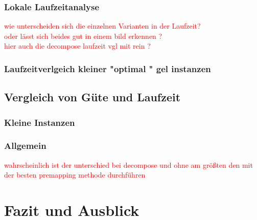 \documentclass[11pt, a4paper, german]{article}
\begin{document}
\subsubsection{Lokale Laufzeitanalyse}
\textcolor{red}{wie unterscheiden sich die einzelnen Varianten in der Laufzeit? \\ oder lässt sich beides gut in einem bild erkennen ?} \\

\textcolor{red}{hier auch die decompose laufzeit vgl mit rein ?}
 
\subsubsection{Laufzeitverlgeich kleiner "optimal " gel instanzen}


\subsection{Vergleich von Güte und  Laufzeit}
\subsubsection{Kleine Instanzen}

\subsubsection{Allgemein}
\textcolor{red}{wahrscheinlich ist der unterschied bei decompose und ohne am größten den mit der besten premapping methode durchführen}

\section{Fazit und Ausblick}
\label{sec:fazit_und_ausblick}
	

\newpage
{}
\nocite{*}
\renewcommand{\refname}{8 \,\, Literaturverzeichnis}



\end{document}

